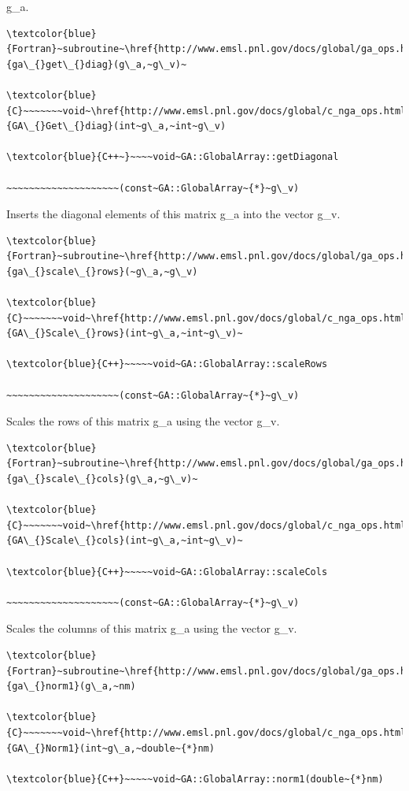 g\_a. 
\begin{verbatim}
\textcolor{blue}{Fortran}~subroutine~\href{http://www.emsl.pnl.gov/docs/global/ga_ops.html\#ga_get_diag}{ga\_{}get\_{}diag}(g\_a,~g\_v)~

\textcolor{blue}{C}~~~~~~~void~\href{http://www.emsl.pnl.gov/docs/global/c_nga_ops.html\#ga_get_diag}{GA\_{}Get\_{}diag}(int~g\_a,~int~g\_v)

\textcolor{blue}{C++~}~~~~void~GA::GlobalArray::getDiagonal

~~~~~~~~~~~~~~~~~~~~(const~GA::GlobalArray~{*}~g\_v)
\end{verbatim}
Inserts the diagonal elements of this matrix g\_a into the vector
g\_v. 
\begin{verbatim}
\textcolor{blue}{Fortran}~subroutine~\href{http://www.emsl.pnl.gov/docs/global/ga_ops.html\#ga_scale_rows}{ga\_{}scale\_{}rows}(~g\_a,~g\_v)

\textcolor{blue}{C}~~~~~~~void~\href{http://www.emsl.pnl.gov/docs/global/c_nga_ops.html\#ga_scale_rows}{GA\_{}Scale\_{}rows}(int~g\_a,~int~g\_v)~

\textcolor{blue}{C++}~~~~~void~GA::GlobalArray::scaleRows

~~~~~~~~~~~~~~~~~~~~(const~GA::GlobalArray~{*}~g\_v)
\end{verbatim}
Scales the rows of this matrix g\_a using the vector g\_v. 
\begin{verbatim}
\textcolor{blue}{Fortran}~subroutine~\href{http://www.emsl.pnl.gov/docs/global/ga_ops.html\#ga_scale_cols}{ga\_{}scale\_{}cols}(g\_a,~g\_v)~

\textcolor{blue}{C}~~~~~~~void~\href{http://www.emsl.pnl.gov/docs/global/c_nga_ops.html\#ga_scale_cols}{GA\_{}Scale\_{}cols}(int~g\_a,~int~g\_v)~

\textcolor{blue}{C++}~~~~~void~GA::GlobalArray::scaleCols

~~~~~~~~~~~~~~~~~~~~(const~GA::GlobalArray~{*}~g\_v)
\end{verbatim}
Scales the columns of this matrix g\_a using the vector g\_v. 
\begin{verbatim}
\textcolor{blue}{Fortran}~subroutine~\href{http://www.emsl.pnl.gov/docs/global/ga_ops.html\#ga_norm1}{ga\_{}norm1}(g\_a,~nm)

\textcolor{blue}{C}~~~~~~~void~\href{http://www.emsl.pnl.gov/docs/global/c_nga_ops.html\#ga_norm1}{GA\_{}Norm1}(int~g\_a,~double~{*}nm)

\textcolor{blue}{C++}~~~~~void~GA::GlobalArray::norm1(double~{*}nm)
\end{verbatim}
